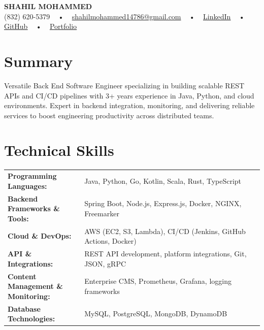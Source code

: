 \documentclass[letterpaper,11pt]{article}
\begin{document}
\begin{center}
    {\fontsize{14pt}{12pt}\selectfont \textbf{\MakeUppercase{Shahil Mohammed}}}\\ \vspace{2pt}
    \fontsize{10pt}{12pt}\selectfont (832) 620-5379 ~ • ~ \href{mailto:shahilmohammed14786@gmail.com}{shahilmohammed14786@gmail.com} ~ • ~  
    \href{https://www.linkedin.com/in/shahil-mohammed-9652931a1/}{\color{blue}\underline{LinkedIn}}  ~ • ~ 
    \href{https://github.com/freakbeast14}{\color{blue}\underline{GitHub}} ~ • ~ 
    \href{https://shahil-mohammed.netlify.app/}{\color{blue}\underline{Portfolio}}
    \vspace{-8pt}
\end{center}

\section{Summary}
\fontsize{9pt}{10pt}\selectfont
Versatile Back End Software Engineer specializing in building scalable REST APIs and CI/CD pipelines with 3+ years experience in Java, Python, and cloud environments. Expert in backend integration, monitoring, and delivering reliable services to boost engineering productivity across distributed teams.
 \vspace{-5pt}
 
\section{Technical Skills}
        \vspace{-14pt}
        \begin{table}[h]
            \fontsize{9pt}{10pt}\selectfont
            \begin{tabular}{p{0.3\linewidth} p{0.7\linewidth}}
                \textbf{Programming Languages:} & Java, Python, Go, Kotlin, Scala, Rust, TypeScript \\
                \textbf{Backend Frameworks \& Tools:} & Spring Boot, Node.js, Express.js, Docker, NGINX, Freemarker \\
                \textbf{Cloud \& DevOps:} & AWS (EC2, S3, Lambda), CI/CD (Jenkins, GitHub Actions, Docker) \\
                \textbf{API \& Integrations:} & REST API development, platform integrations, Git, JSON, gRPC \\
                \textbf{Content Management \& Monitoring:} & Enterprise CMS, Prometheus, Grafana, logging frameworks \\
                \textbf{Database Technologies:} & MySQL, PostgreSQL, MongoDB, DynamoDB \\
            \end{tabular}
        \end{table}
 \vspace{-15pt}
 
\end{document}
